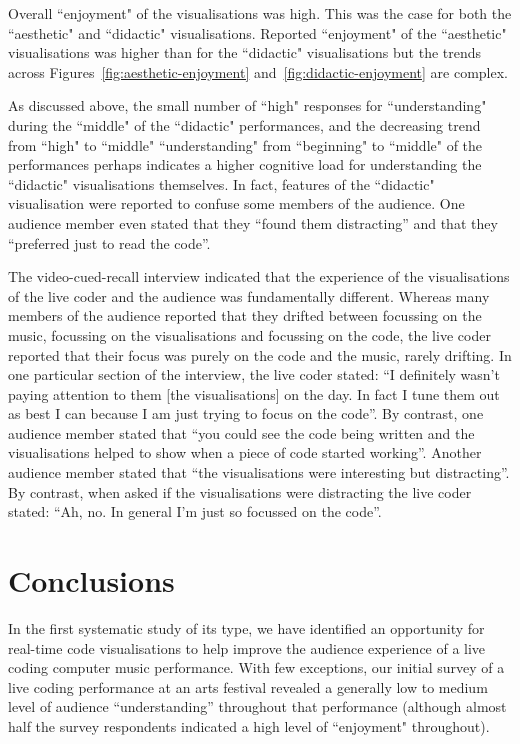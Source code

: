 \documentclass{sig-alternate}
\begin{document}
Overall ``enjoyment" of the visualisations was high. This was the case for both the ``aesthetic" and ``didactic" visualisations.
Reported ``enjoyment" of the ``aesthetic" visualisations was higher than for the ``didactic" visualisations but the trends across Figures~\ref{fig:aesthetic-enjoyment} and~\ref{fig:didactic-enjoyment} are complex. 

As discussed above, the small number of ``high" responses for ``understanding" during the ``middle" of the ``didactic" performances, and the decreasing trend from ``high" to ``middle" ``understanding" from ``beginning" to ``middle" of the performances perhaps indicates a higher cognitive load for understanding the ``didactic" visualisations themselves. In fact, features of the ``didactic" visualisation were reported to confuse some members of the audience. One audience member even stated that they ``found them distracting'' and that they ``preferred just to read the code''.

The video-cued-recall interview indicated that the experience of the visualisations of the live coder and the  audience was fundamentally different. Whereas many members of the audience reported that they drifted between focussing on the music, focussing on the visualisations and focussing on the code, the live coder reported that their focus was  purely on the code and the music, rarely drifting. In one particular section of the interview, the live coder stated: ``I definitely wasn't paying attention to them [the visualisations] on the day. In fact I tune them out as best I can because I am just trying to focus on the code''. By contrast, one audience member stated that ``you could see the code being written and the visualisations helped to show when a piece of code started working''. Another audience member stated that ``the visualisations were interesting but distracting''. By contrast, when asked if the visualisations were distracting the live coder stated: ``Ah, no. In general I'm just so focussed on the code''. 

\section{Conclusions}

In the first systematic study of its type, we have identified an opportunity for real-time code visualisations to help improve the audience experience of a live coding computer music performance. With few exceptions, our initial survey of a live coding performance at an arts festival revealed a generally low to medium level of audience ``understanding'' throughout that performance (although almost half the survey respondents indicated a high level of ``enjoyment" throughout).
\end{document}
